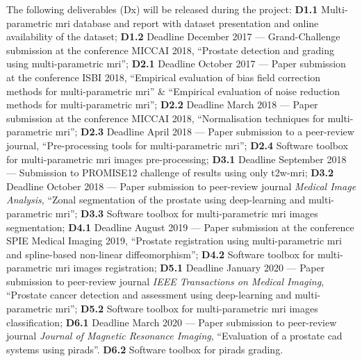The following deliverables (Dx) will be released during the project:
\textbf{D1.1} Multi-parametric \ac{mri} database and report with dataset presentation and online availability of the dataset;
\textbf{D1.2} Deadline December 2017 --- Grand-Challenge submission at the conference MICCAI 2018, ``Prostate detection and grading using multi-parametric \ac{mri}'';
\textbf{D2.1} Deadline October 2017 --- Paper submission at the conference ISBI 2018, ``Empirical evaluation of bias field correction methods for multi-parametric \ac{mri}'' \& ``Empirical evaluation of noise reduction methods for multi-parametric \ac{mri}'';
\textbf{D2.2} Deadline March 2018 --- Paper submission at the conference MICCAI 2018, ``Normalisation techniques for multi-parametric \ac{mri}'';
\textbf{D2.3} Deadline April 2018 --- Paper submission to a peer-review journal, ``Pre-processing tools for multi-parametric \ac{mri}'';
\textbf{D2.4} Software toolbox for multi-parametric \ac{mri} images pre-processing;
\textbf{D3.1} Deadline September 2018 --- Submission to PROMISE12 challenge of results using only \ac{t2w}-\ac{mri};
\textbf{D3.2} Deadline October 2018 --- Paper submission to peer-review journal \emph{Medical Image Analysis}, ``Zonal segmentation of the prostate using deep-learning and multi-parametric \ac{mri}'';
\textbf{D3.3} Software toolbox for multi-parametric \ac{mri} images segmentation;
\textbf{D4.1} Deadline August 2019 --- Paper submission at the conference SPIE Medical Imaging 2019, ``Prostate registration using multi-parametric \ac{mri} and spline-based non-linear diffeomorphism'';
\textbf{D4.2} Software toolbox for multi-parametric \ac{mri} images registration;
\textbf{D5.1} Deadline January 2020 --- Paper submission to peer-review journal \emph{IEEE Transactions on Medical Imaging}, ``Prostate cancer detection and assessment using deep-learning and multi-parametric \ac{mri}'';
\textbf{D5.2} Software toolbox for multi-parametric \ac{mri} images classification;
\textbf{D6.1} Deadline March 2020 --- Paper submission to peer-review journal \emph{Journal of Magnetic Resonance Imaging}, ``Evaluation of a prostate \ac{cad} systems using \ac{pirads}''.
\textbf{D6.2} Software toolbox for \ac{pirads} grading.

